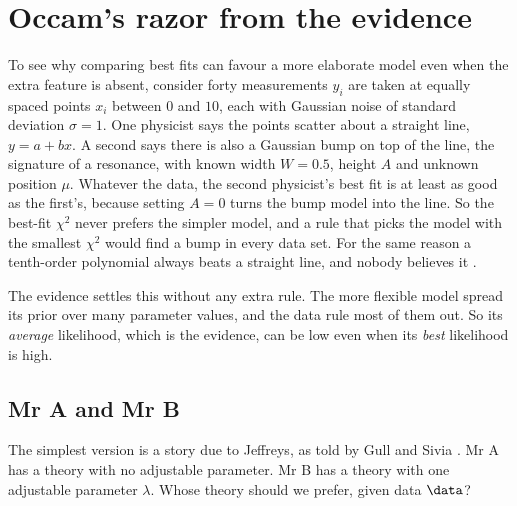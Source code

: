 \section{Occam's razor from the evidence}
\label{5c:sec:occam}

To see why comparing best fits can favour a more elaborate model even when
the extra feature is absent, consider forty measurements
$y_i$ are taken at equally spaced points $x_i$ between $0$ and $10$, each with
Gaussian noise of standard deviation $\sigma=1$. One physicist says the points
scatter about a straight line, $y=a+bx$. A second says there is also a Gaussian bump
on top of the line, the signature of a resonance, with known width $W=0.5$, height $A$
and unknown position $\mu$. Whatever the data, the second physicist's best fit is at
least as good as the first's, because setting $A=0$ turns the bump model into the
line. So the best-fit $\chi^2$ never prefers the simpler model, and a rule that picks
the model with the smallest $\chi^2$ would find a bump in every data set. For the
same reason a tenth-order polynomial always beats a straight line, and nobody believes
it .

The evidence settles this without any extra rule. The more flexible model spread its
prior over many parameter values, and the data rule most of them out. So its
\emph{average} likelihood, which is the evidence, can be low even when its
\emph{best} likelihood is high.

\subsection{Mr A and Mr B}
\label{5c:sec:mrab}

The simplest version is a story due to Jeffreys, as told by Gull and Sivia
. Mr A has a theory with no adjustable parameter. Mr B has a
theory with one adjustable parameter $\lambda$. Whose theory should we prefer, given
data $\data$?

